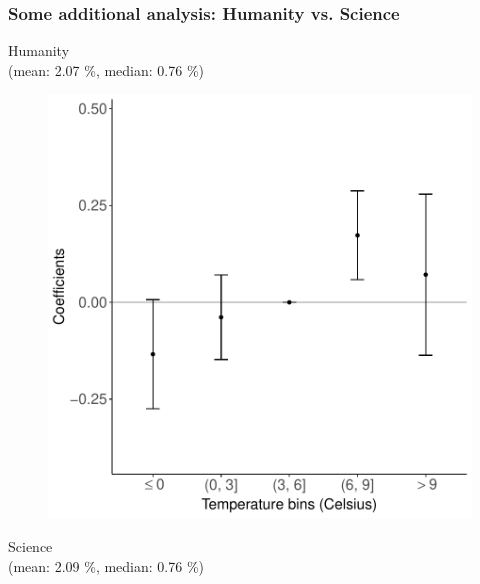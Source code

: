 \documentclass[10pt, pdfmx,hiresbb]{beamer}
\begin{document}
\begin{frame}\frametitle{Some additional analysis: Humanity vs. Science}
  \begin{minipage}{0.49\textwidth}
    \begin{center}
      Humanity \\
      (mean: 2.07 \%, median: 0.76 \%)
    \end{center}
    \begin{figure}[h]
      \centering
      \includegraphics[width = \textwidth]{../Output/images/reg_major_2.pdf}
    \end{figure}
  \end{minipage}
  \begin{minipage}{0.49\textwidth}
    \begin{center}
      Science \\
      (mean: 2.09 \%, median: 0.76 \%)
    \end{center}
    \begin{figure}[h]

\end{figure}
\end{minipage}
\end{frame}
\end{document}
